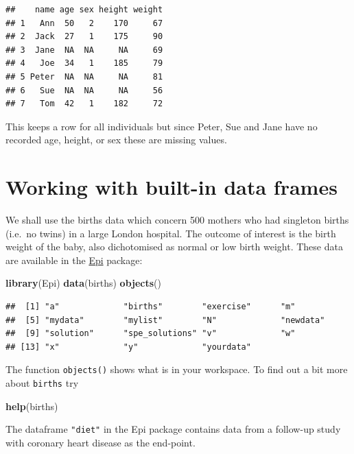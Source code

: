 \documentclass[
]{book}
\newenvironment{Shaded}{\begin{snugshade}}{\end{snugshade}}
\newcommand{\FunctionTok}[1]{\textcolor[rgb]{0.13,0.29,0.53}{\textbf{#1}}}
\newcommand{\NormalTok}[1]{#1}
\theoremstyle{definition}
\theoremstyle{definition}
\theoremstyle{definition}
\theoremstyle{definition}
\theoremstyle{remark}
\begin{document}
\begin{verbatim}
##    name age sex height weight
## 1   Ann  50   2    170     67
## 2  Jack  27   1    175     90
## 3  Jane  NA  NA     NA     69
## 4   Joe  34   1    185     79
## 5 Peter  NA  NA     NA     81
## 6   Sue  NA  NA     NA     56
## 7   Tom  42   1    182     72
\end{verbatim}

This keeps a row for all individuals but since Peter, Sue and Jane
have no recorded age, height, or sex these are missing values.

\section{Working with built-in data frames}\label{working-with-built-in-data-frames}

We shall use the births data which concern 500 mothers who had
singleton births (i.e.~no twins) in a large London hospital. The
outcome of interest is the birth weight of the baby, also dichotomised
as normal or low birth weight. These data are available in the \href{https://cran.r-project.org/web/packages/Epi/index.html}{Epi}
package:

\begin{Shaded}
\begin{Highlighting}[]
\FunctionTok{library}\NormalTok{(Epi)}
\FunctionTok{data}\NormalTok{(births)}
\FunctionTok{objects}\NormalTok{()}
\end{Highlighting}
\end{Shaded}

\begin{verbatim}
##  [1] "a"             "births"        "exercise"      "m"            
##  [5] "mydata"        "mylist"        "N"             "newdata"      
##  [9] "solution"      "spe_solutions" "v"             "w"            
## [13] "x"             "y"             "yourdata"
\end{verbatim}

The function \texttt{objects()} shows what is in your workspace. To
find out a bit more about \texttt{births} try

\begin{Shaded}
\begin{Highlighting}[]
\FunctionTok{help}\NormalTok{(births)}
\end{Highlighting}
\end{Shaded}

The dataframe \texttt{"diet"} in the Epi package contains data from a follow-up study with
coronary heart disease as the end-point.
\end{document}
